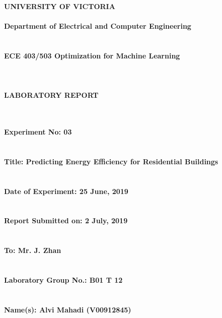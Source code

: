\documentclass[11pt,a4paper,twoside]{article}
\begin{document}
\begin{center}
{\bf {\Huge UNIVERSITY OF VICTORIA} ~\\
	~\\
	{\huge Department of Electrical and Computer Engineering} ~\\
	~\\
	~\\
	{\huge ECE 403/503 Optimization for Machine Learning} ~\\
	~\\
	~\\
	~\\
	{\huge LABORATORY REPORT}
	~\\
	~\\
	~\\
}
\end{center}
{\bf
{\LARGE Experiment No: 03}
~\\
~\\
~\\
{\LARGE Title: Predicting Energy Efficiency for Residential Buildings}
~\\
~\\
~\\
{\LARGE Date of Experiment: 25 June, 2019}
~\\
~\\
~\\
{\LARGE Report Submitted on: 2 July, 2019}
~\\
~\\
~\\
{\LARGE To: Mr. J. Zhan}
~\\
~\\
~\\
{\LARGE Laboratory Group No.: B01 T 12}
~\\
~\\
~\\
{\LARGE Name(s): Alvi Mahadi (V00912845)}
~\\
~\\
~\\
}

\newpage




\end{document}
